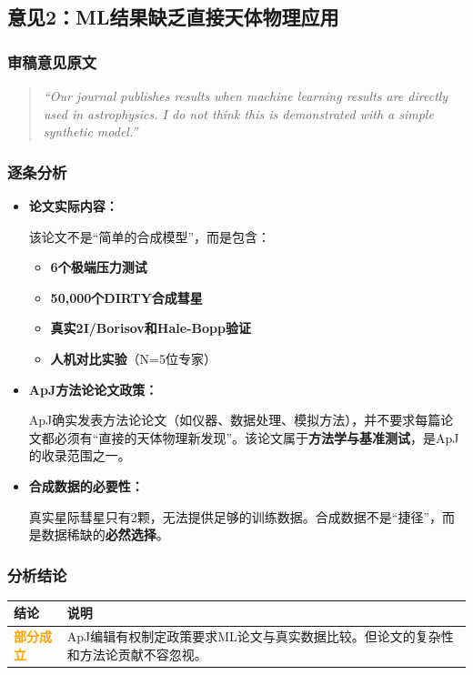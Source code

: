 \documentclass[12pt,a4paper]{article}
\begin{document}
\subsection{意见2：ML结果缺乏直接天体物理应用}

\subsubsection{审稿意见原文}
\begin{quote}
\textit{``Our journal publishes results when machine learning results are directly used in astrophysics. I do not think this is demonstrated with a simple synthetic model.''}
\end{quote}

\subsubsection{逐条分析}

\begin{itemize}[leftmargin=*]
    \item \textbf{论文实际内容：}

    该论文不是``简单的合成模型''，而是包含：
    \begin{itemize}
        \item \textbf{6个极端压力测试}
        \item \textbf{50,000个DIRTY合成彗星}
        \item \textbf{真实2I/Borisov和Hale-Bopp验证}
        \item \textbf{人机对比实验}（N=5位专家）
    \end{itemize}

    \item \textbf{ApJ方法论论文政策：}

    ApJ确实发表方法论论文（如仪器、数据处理、模拟方法），并不要求每篇论文都必须有``直接的天体物理新发现''。该论文属于\textbf{方法学与基准测试}，是ApJ的收录范围之一。

    \item \textbf{合成数据的必要性：}

    真实星际彗星只有2颗，无法提供足够的训练数据。合成数据不是``捷径''，而是数据稀缺的\textbf{必然选择}。
\end{itemize}

\subsubsection{分析结论}
\begin{center}
\begin{tabular}{|p{3cm}|p{10cm}|}
\hline
\rowcolor{gray!20}
\textbf{结论} & \textbf{说明} \\
\hline
\textcolor{orange}{\textbf{部分成立}} & ApJ编辑有权制定政策要求ML论文与真实数据比较。但论文的复杂性和方法论贡献不容忽视。 \\
\hline
\end{tabular}
\end{center}
\end{document}
